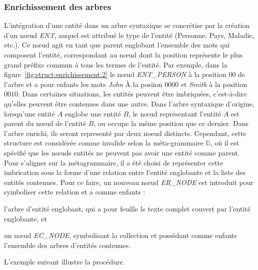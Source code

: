 \subsubsection{Enrichissement des arbres}
L'intégration d'une entité dans un arbre syntaxique se concrétise par la création d'un nœud \emph{ENT}, auquel est attribué le type de l'entité (Personne, Pays, Maladie, etc.).
Ce nœud agit en tant que parent englobant l'ensemble des mots qui composent l'entité, correspondant au nœud dont la position représente le plus grand préfixe commun à tous les termes de l'entité.
Par exemple, dans la figure~\ref{fig:struct:enrichissement:2} le nœud \emph{ENT\_PERSON} à la position $00$ de l'arbre et a pour enfants les mots \emph{John} À la posiion $0000$ et \emph{Smith} à la position $0010$.
Dans certaines situations, les entités peuvent être imbriquées, c'est-à-dire qu'elles peuvent être contenues dans une autre.
Dans l'arbre syntaxique d'origine, lorsqu'une entité $A$ englobe une entité $B$, le nœud représentant l'entité $A$ est parent du nœud de l'entité $B$, ou occupe la même position que ce dernier.
Dans l'arbre enrichi, ils seront representé par deux noeud distincts.
Cependant, cette structure est considérée comme invalide selon la méta-grammaire $\mathbb{G}$, où il est spécifié que les nœuds entités ne peuvent pas avoir une entité comme parent.
Pour s'aligner sur la métagrammaire, il a été choisi de représenter cette imbrication sous la forme d'une relation entre l'entité englobante et la liste des entités contenues.
Pour ce faire, un nouveau nœud \emph{ER\_NODE} est introduit pour symboliser cette relation et a comme enfants :
\begin{enumerate*}[label=(\roman*)]
    \item l'arbre d'entité englobant, qui a pour feuille le texte complet couvert par l'entité englobante, et
    \item un nœud \emph{EC\_NODE}, symbolisant la collection et possédant comme enfants l'ensemble des arbres d'entités contenues.
\end{enumerate*}
L'exemple suivant illustre la procédure.

